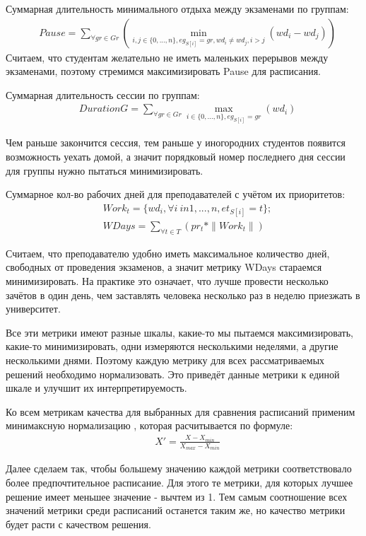 Суммарная длительность минимального отдыха между экзаменами по группам:
\begin{align}
	& {Pause} =  \sum\limits_{\forall  gr \in Gr}(\min\limits_{i,j \in \{0,...,n\}, eg_{S[i]} = gr, wd_i \neq wd_j, i>j}(wd_i - wd_j))
\end{align}
Считаем, что студентам желательно не иметь маленьких перерывов между экзаменами, поэтому стремимся максимизировать Pause для расписания.

Суммарная длительность сессии по группам:
\begin{align}
	& {DurationG} =  \sum\limits_{\forall  gr \in Gr}\max\limits_{i \in \{0,...,n\}, eg_{S[i]} = gr}(wd_i)
\end{align}

Чем раньше закончится сессия, тем раньше у иногородних студентов появится возможность уехать домой, а значит порядковый номер последнего дня сессии для группы нужно пытаться минимизировать.

Суммарное кол-во рабочих дней для преподавателей с учётом их приоритетов:
\begin{align}
	& Work_t = \{wd_i, \forall i \ in {1,...,n}, et_{S[i]} = t\};\\
	& {WDays} =  \sum\limits_{\forall  t \in T}(pr_t * \|Work_t\|) 
\end{align}

Считаем, что преподавателю удобно иметь максимальное количество дней, свободных от проведения экзаменов, а значит метрику WDays стараемся минимизировать. На практике это означает, что лучше провести несколько зачётов в один день, чем заставлять человека несколько раз в неделю приезжать в университет.

Все эти метрики имеют разные шкалы, какие-то мы пытаемся максимизировать, какие-то минимизировать, одни измеряются несколькими неделями, а другие несколькими днями. Поэтому каждую метрику для всех рассматриваемых решений необходимо нормализовать. Это приведёт данные метрики к единой шкале и улучшит их интерпретируемость.

Ко всем метрикам качества для выбранных для сравнения расписаний применим минимаксную нормализацию \cite{minimax}, которая расчитывается по формуле:
\begin{align}
	& X' =  \frac{X-X_{min}}{X_{max}-X_{min}}
\end{align}

Далее сделаем так, чтобы большему значению каждой метрики соответствовало более предпочтительное расписание. Для этого те метрики, для которых лучшее решение имеет меньшее значение - вычтем из 1. Тем самым соотношение всех значений метрики среди расписаний останется таким же, но качество метрики будет расти с качеством решения. 

